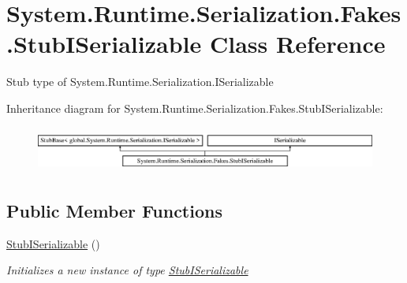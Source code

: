 \hypertarget{class_system_1_1_runtime_1_1_serialization_1_1_fakes_1_1_stub_i_serializable}{\section{System.\-Runtime.\-Serialization.\-Fakes.\-Stub\-I\-Serializable Class Reference}
\label{class_system_1_1_runtime_1_1_serialization_1_1_fakes_1_1_stub_i_serializable}
}


Stub type of System.\-Runtime.\-Serialization.\-I\-Serializable 


Inheritance diagram for System.\-Runtime.\-Serialization.\-Fakes.\-Stub\-I\-Serializable\-:\begin{figure}[H]
\begin{center}
\leavevmode
\includegraphics[height=1.517615cm]{class_system_1_1_runtime_1_1_serialization_1_1_fakes_1_1_stub_i_serializable}
\end{center}
\end{figure}
\subsection*{Public Member Functions}
\begin{DoxyCompactItemize}
\item 
\hyperlink{class_system_1_1_runtime_1_1_serialization_1_1_fakes_1_1_stub_i_serializable_a3f9e922d64810291b195726d21e3ed01}{Stub\-I\-Serializable} ()
\begin{DoxyCompactList}\small\item\em Initializes a new instance of type \hyperlink{class_system_1_1_runtime_1_1_serialization_1_1_fakes_1_1_stub_i_serializable}{Stub\-I\-Serializable}\end{DoxyCompactList}\end{DoxyCompactItemize}

